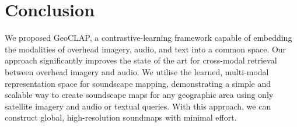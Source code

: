 \documentclass{bmvc2k}
\begin{document}
\section{Conclusion}
\label{sec:conclusion}
We proposed GeoCLAP, a contrastive-learning framework capable of embedding the modalities of overhead imagery, audio, and text into a common space. Our approach significantly improves the state of the art for cross-modal retrieval between overhead imagery and audio. We utilise the learned, multi-modal representation space for soundscape mapping, demonstrating a simple and scalable way to create soundscape maps for any geographic area using only satellite imagery and audio or textual queries. With this approach, we can construct global, high-resolution soundmaps with minimal effort.


\end{document}
